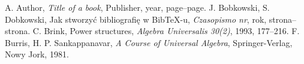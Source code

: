 \documentclass[../praca-dyplomowa.tex]{subfiles}
\begin{document}
\begin{thebibliography}{20}%

   A. Author, \emph{Title of a book}, Publisher, year, page--page.
   J. Bobkowski, S. Dobkowski, Jak stworzyć bibliografię w BibTeX-u, \emph{Czasopismo nr}, rok, strona--strona.
   C. Brink, Power structures, \emph{Algebra Universalis 30(2)}, 1993, 177--216.
   F. Burris, H. P. Sankappanavar, \emph{A Course of Universal Algebra}, Springer-Verlag, Nowy Jork, 1981.
\end{thebibliography}
\end{document}
